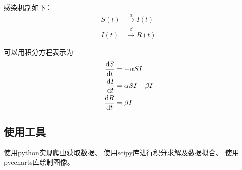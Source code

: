 \par 感染机制如下：
\begin{align}
    S(t) & \xrightarrow \alpha I(t) \\
    I(t) & \xrightarrow \beta R(t)
\end{align}
\par 可以用积分方程表示为
\begin{align}
    \frac{\mathrm{d}S}{\mathrm{d}t} & = -\alpha SI          \\
    \frac{\mathrm{d}I}{\mathrm{d}t} & = \alpha SI - \beta I \\
    \frac{\mathrm{d}R}{\mathrm{d}t} & = \beta I
\end{align}
\subsection{使用工具}
使用python实现爬虫获取数据、
使用scipy库进行积分求解及数据拟合、
使用pyecharts库绘制图像。